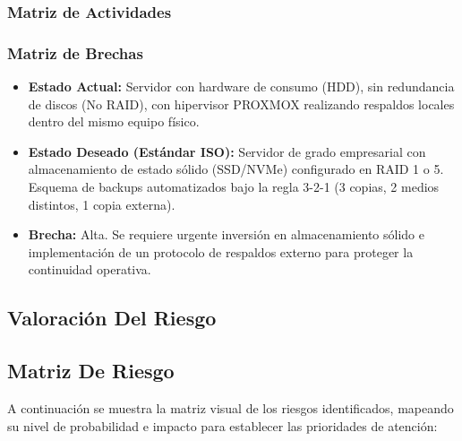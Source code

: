 \documentclass[12pt]{article}
\begin{document}
\subsubsection{Matriz de Actividades}

\subsubsection{Matriz de Brechas}
\begin{itemize}
    \item \textbf{Estado Actual:} Servidor con hardware de consumo (HDD), sin redundancia de discos (No RAID), con hipervisor PROXMOX realizando respaldos locales dentro del mismo equipo físico.
    \item \textbf{Estado Deseado (Estándar ISO):} Servidor de grado empresarial con almacenamiento de estado sólido (SSD/NVMe) configurado en RAID 1 o 5. Esquema de backups automatizados bajo la regla 3-2-1 (3 copias, 2 medios distintos, 1 copia externa).
    \item \textbf{Brecha:} Alta. Se requiere urgente inversión en almacenamiento sólido e implementación de un protocolo de respaldos externo para proteger la continuidad operativa.
\end{itemize}

\subsection{Valoración Del Riesgo}
\subsection{Matriz De Riesgo}

A continuación se muestra la matriz visual de los riesgos identificados, mapeando su nivel de probabilidad e impacto para establecer las prioridades de atención:
\end{document}
